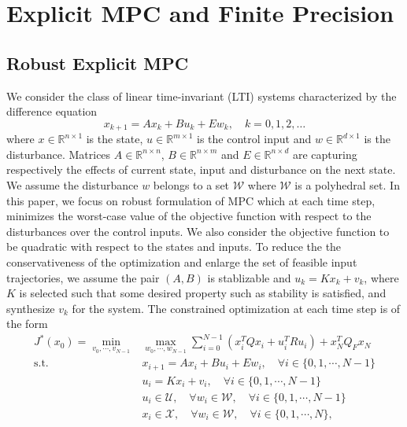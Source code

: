 \section{Explicit MPC and Finite Precision}
\subsection{Robust Explicit MPC}
\def\reals{\mathbb{R}}
We consider the class of linear time-invariant (LTI) systems characterized by the difference equation
\begin{equation}
\label{eq:DSS}
x_{k+1}=Ax_k+Bu_k+Ew_k,\quad  k=0,1,2,\ldots
\end{equation}
where $x\in \reals^{n\times 1}$ is the state, $u\in \reals^{m\times 1}$ is the control input and $w\in \reals^{d\times 1}$ is the disturbance. Matrices $A\in \reals^{n\times n}$, $B\in \reals^{n\times m}$ and $E\in \reals^{n\times d}$ are capturing respectively the effects of current state, input and disturbance on the next state. We assume the disturbance $w$ belongs to a set $\mathcal{W}$ where $\mathcal{W}$ is a polyhedral set.
In this paper, we focus on robust formulation of MPC which at each time step, minimizes the worst-case value of the objective function with respect to the disturbances over the control inputs. We also consider the objective function to be quadratic with respect to the states and inputs. To reduce the the conservativeness of the optimization and enlarge the set of feasible input trajectories, we assume the pair $(A,B)$ is stablizable and
$u_k=Kx_k+v_k$, where $K$ is selected such that some desired property such as stability is satisfied, and synthesize $v_k$ for the system.
The constrained optimization at each time step is of the form
\begin{align}
\label{eq:RMPC_prob}
J^{\ast}(x_0)=\min_{v_0,\cdots,v_{N-1}}& \max_{w_0,\cdots,w_{N-1}} \sum_{i=0}^{N-1}(x_i^TQx_i+u_i^TRu_i) + x_N^TQ_Fx_N\nonumber\\
\text{s.t.} \quad &x_{i+1}=Ax_i+Bu_i + E w_i, \quad\forall i\in\{0,1,\cdots,N-1\}\nonumber\\
\quad &u_i=Kx_i+v_i, \quad\forall i\in\{0,1,\cdots,N-1\}\nonumber\\
&u_i\in\mathcal{U},\quad \forall w_i\in\mathcal{W}, \quad\forall i\in\{0,1,\cdots,N-1\}\nonumber\\
&x_i\in\mathcal{X},\quad \forall w_i\in\mathcal{W},\quad\forall i\in\{0,1,\cdots,N\},
\end{align}
